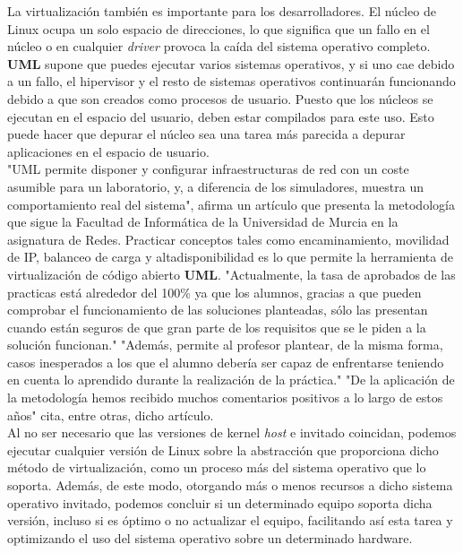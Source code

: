 \documentclass[11pt,twoside,titlepage,a4paper]{article}
\theoremstyle{definition}
\theoremstyle{plain_rojo}
\theoremstyle{remark}
\begin{document}
La virtualización también es importante para los desarrolladores. El núcleo 
de Linux ocupa un solo espacio de direcciones, lo que significa que un fallo 
en el núcleo o en cualquier \textit{driver} provoca la caída del sistema 
operativo completo. \textbf{UML} supone que puedes ejecutar varios sistemas 
operativos, y si uno cae debido a un fallo, el hipervisor y el resto de 
sistemas operativos continuarán funcionando debido a que son creados como 
procesos de usuario. Puesto que los núcleos se ejecutan en el espacio del 
usuario, deben estar compilados para este uso. Esto puede hacer que depurar 
el núcleo sea una tarea más parecida a depurar aplicaciones en el espacio de 
usuario.
\\

"UML permite disponer y configurar infraestructuras de red con un coste 
asumible para un laboratorio, y, a diferencia de los simuladores, muestra un 
comportamiento real del sistema", afirma un artículo que presenta la 
metodología que sigue la Facultad de Informática de la Universidad de Murcia 
en la asignatura de Redes. Practicar conceptos tales como encaminamiento, 
movilidad de IP, balanceo de carga y altadisponibilidad es lo que permite la 
herramienta de virtualización de código abierto \textbf{UML}. "Actualmente, 
la tasa de aprobados de las practicas está alrededor del 100\% ya que los 
alumnos, gracias a que pueden comprobar el funcionamiento de las soluciones 
planteadas, sólo las presentan cuando están seguros de que gran parte de los 
requisitos que se le piden a la solución funcionan." "Además, permite al 
profesor plantear, de la misma forma, casos inesperados a los que el alumno 
debería ser capaz de enfrentarse teniendo en cuenta lo aprendido durante la 
realización de la práctica." "De la aplicación de la metodología hemos 
recibido muchos comentarios positivos a lo largo de estos años" cita, entre 
otras, dicho artículo.
\\

Al no ser necesario que las versiones de kernel \textit{host} e invitado 
coincidan,  podemos ejecutar cualquier versión de Linux sobre la abstracción 
que proporciona dicho método de virtualización, como un proceso más del 
sistema operativo que lo soporta. Además, de este modo, otorgando más o menos 
recursos a dicho sistema operativo invitado, podemos concluir si un 
determinado equipo soporta dicha versión, incluso si es óptimo o no 
actualizar el equipo, facilitando así esta tarea y optimizando el uso del 
sistema operativo sobre un determinado hardware.
\\
\end{document}

